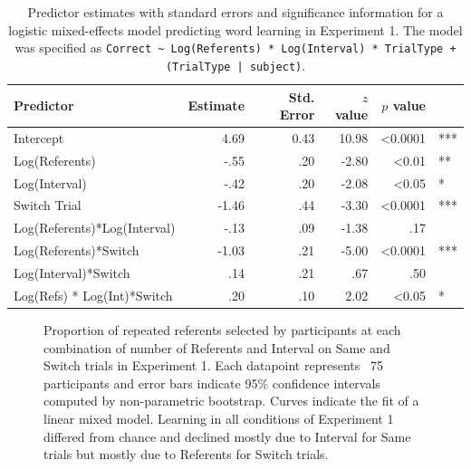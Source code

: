 \documentclass{pnastwo}
\begin{document}
\begin{article}
\begin{table}
\begin{center}
\begin{tabular}{lrrrrl}
\hline
Predictor & Estimate & Std. Error & $z$ value & $p$ value & \\
\hline
Intercept & 4.69 & 0.43  & 10.98 &  <0.0001 & ***  \\
Log(Referents)  & -.55 & .20  & -2.80 &  <0.01 & **   \\
Log(Interval)  & -.42 & .20  & -2.08 &  <0.05 & *  \\
Switch Trial  & -1.46 & .44  & -3.30 &  <0.0001 & ***   \\
Log(Referents)*Log(Interval)  & -.13 & .09 & -1.38 &  .17 &  \\
Log(Referents)*Switch  & -1.03 & .21 & -5.00 &  <0.0001 & ***   \\
Log(Interval)*Switch  & .14 & .21  & .67 &  .50 &  \\
Log(Refs) * Log(Int)*Switch  & .20 & .10  & 2.02 &  <0.05 & *  \\
\hline
\end{tabular}
\end{center}
\caption{\label{tab:exp1_reg}Predictor estimates with standard errors and significance information for a logistic mixed-effects model predicting word learning in Experiment 1. The model was specified as \small{\tt{Correct \textasciitilde \hspace{1pt} Log(Referents) * Log(Interval) * TrialType + (TrialType | subject)}}.}
\end{table}

 \begin{figure}[t]
	\caption{\label{fig:exp1_2_data} Proportion of repeated referents selected by participants at each combination of number of Referents and Interval on Same and Switch trials in Experiment 1. Each datapoint represents ~75 participants  and error bars indicate 95\% confidence intervals computed by non-parametric bootstrap. Curves indicate the fit of a linear mixed model. Learning in all conditions of Experiment 1 differed from chance and declined mostly due to Interval for Same trials but mostly due to Referents for Switch trials.} 
\end{figure}


\end{article}
\end{document}
